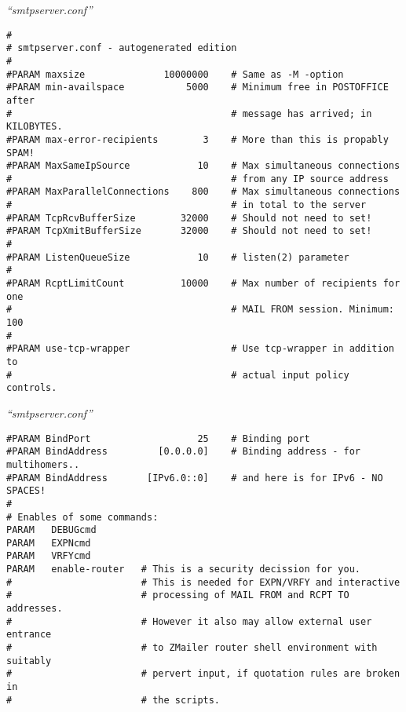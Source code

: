 \documentclass[a4paper,landscape]{slides}
\begin{document}
\begin{overlay}
\small
\centerline{{\it ``smtpserver.conf''}}
\tiny

\begin{verbatim}
#
# smtpserver.conf - autogenerated edition
#
#PARAM maxsize              10000000    # Same as -M -option
#PARAM min-availspace           5000    # Minimum free in POSTOFFICE after
#                                       # message has arrived; in KILOBYTES.
#PARAM max-error-recipients        3    # More than this is propably SPAM!
#PARAM MaxSameIpSource            10    # Max simultaneous connections
#                                       # from any IP source address
#PARAM MaxParallelConnections    800    # Max simultaneous connections
#                                       # in total to the server
#PARAM TcpRcvBufferSize        32000    # Should not need to set!
#PARAM TcpXmitBufferSize       32000    # Should not need to set!
#
#PARAM ListenQueueSize            10    # listen(2) parameter
#
#PARAM RcptLimitCount          10000    # Max number of recipients for one
#                                       # MAIL FROM session. Minimum: 100
#
#PARAM use-tcp-wrapper                  # Use tcp-wrapper in addition to
#                                       # actual input policy controls.
\end{verbatim}
\end{overlay}
\begin{overlay}
\small
\centerline{{\it ``smtpserver.conf''}}
\tiny
\begin{verbatim}
#PARAM BindPort                   25    # Binding port
#PARAM BindAddress         [0.0.0.0]    # Binding address - for multihomers..
#PARAM BindAddress       [IPv6.0::0]    # and here is for IPv6 - NO SPACES!
#
# Enables of some commands:
PARAM   DEBUGcmd
PARAM   EXPNcmd
PARAM   VRFYcmd
PARAM   enable-router   # This is a security decission for you.
#                       # This is needed for EXPN/VRFY and interactive
#                       # processing of MAIL FROM and RCPT TO addresses.
#                       # However it also may allow external user entrance
#                       # to ZMailer router shell environment with suitably
#                       # pervert input, if quotation rules are broken in
#                       # the scripts.
\end{verbatim}
\end{overlay}
\end{document}
